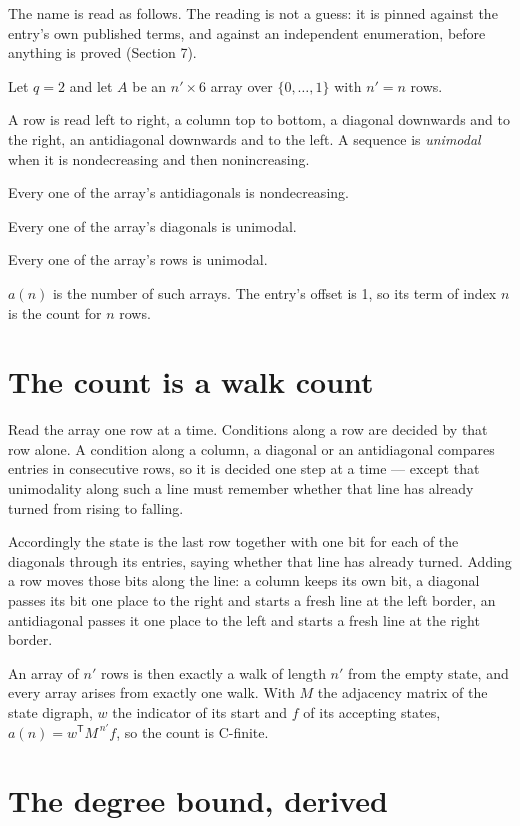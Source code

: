 \documentclass[11pt]{article}
\theoremstyle{definition}
\begin{document}
The name is read as follows. The reading is not a guess: it is pinned against the entry's own published terms, and against an independent enumeration, before anything is proved (Section 7).

Let $q = 2$ and let $A$ be an $n' \times 6$ array over $\{0,\dots,1\}$ with $n' = n$ rows.

A row is read left to right, a column top to bottom, a diagonal downwards and to the right, an antidiagonal downwards and to the left. A sequence is {\itshape unimodal} when it is nondecreasing and then nonincreasing.

Every one of the array's antidiagonals is nondecreasing.

Every one of the array's diagonals is unimodal.

Every one of the array's rows is unimodal.

$a(n)$ is the number of such arrays. The entry's offset is 1, so its term of index $n$ is the count for $n$ rows.

\section{The count is a walk count}

Read the array one row at a time. Conditions along a row are decided by that row alone. A condition along a column, a diagonal or an antidiagonal compares entries in consecutive rows, so it is decided one step at a time --- except that unimodality along such a line must remember whether that line has already turned from rising to falling.

Accordingly the state is the last row together with one bit for each of the diagonals through its entries, saying whether that line has already turned. Adding a row moves those bits along the line: a column keeps its own bit, a diagonal passes its bit one place to the right and starts a fresh line at the left border, an antidiagonal passes it one place to the left and starts a fresh line at the right border.

An array of $n'$ rows is then exactly a walk of length $n'$ from the empty state, and every array arises from exactly one walk. With $M$ the adjacency matrix of the state digraph, $w$ the indicator of its start and $f$ of its accepting states, $a(n) = w^{\mathsf T}M^{\,n'}f$, so the count is C-finite.

\section{The degree bound, derived}
\end{document}
